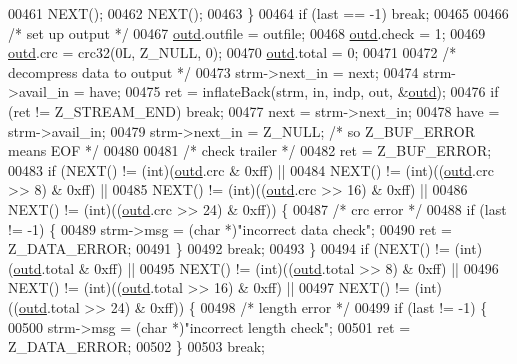 \begin{DoxyCode}
00461             NEXT();
00462             NEXT();
00463         \}
00464         \textcolor{keywordflow}{if} (last == -1) \textcolor{keywordflow}{break};
00465 
00466         \textcolor{comment}{/* set up output */}
00467         \hyperlink{structoutd}{outd}.outfile = outfile;
00468         \hyperlink{structoutd}{outd}.check = 1;
00469         \hyperlink{structoutd}{outd}.crc = crc32(0L, Z\_NULL, 0);
00470         \hyperlink{structoutd}{outd}.total = 0;
00471 
00472         \textcolor{comment}{/* decompress data to output */}
00473         strm->next\_in = next;
00474         strm->avail\_in = have;
00475         ret = inflateBack(strm, in, indp, out, &\hyperlink{structoutd}{outd});
00476         \textcolor{keywordflow}{if} (ret != Z\_STREAM\_END) \textcolor{keywordflow}{break};
00477         next = strm->next\_in;
00478         have = strm->avail\_in;
00479         strm->next\_in = Z\_NULL;             \textcolor{comment}{/* so Z\_BUF\_ERROR means EOF */}
00480 
00481         \textcolor{comment}{/* check trailer */}
00482         ret = Z\_BUF\_ERROR;
00483         \textcolor{keywordflow}{if} (NEXT() != (\textcolor{keywordtype}{int})(\hyperlink{structoutd}{outd}.crc & 0xff) ||
00484             NEXT() != (\textcolor{keywordtype}{int})((\hyperlink{structoutd}{outd}.crc >> 8) & 0xff) ||
00485             NEXT() != (\textcolor{keywordtype}{int})((\hyperlink{structoutd}{outd}.crc >> 16) & 0xff) ||
00486             NEXT() != (\textcolor{keywordtype}{int})((\hyperlink{structoutd}{outd}.crc >> 24) & 0xff)) \{
00487             \textcolor{comment}{/* crc error */}
00488             \textcolor{keywordflow}{if} (last != -1) \{
00489                 strm->msg = (\textcolor{keywordtype}{char} *)\textcolor{stringliteral}{"incorrect data check"};
00490                 ret = Z\_DATA\_ERROR;
00491             \}
00492             \textcolor{keywordflow}{break};
00493         \}
00494         \textcolor{keywordflow}{if} (NEXT() != (int)(\hyperlink{structoutd}{outd}.total & 0xff) ||
00495             NEXT() != (int)((\hyperlink{structoutd}{outd}.total >> 8) & 0xff) ||
00496             NEXT() != (int)((\hyperlink{structoutd}{outd}.total >> 16) & 0xff) ||
00497             NEXT() != (int)((\hyperlink{structoutd}{outd}.total >> 24) & 0xff)) \{
00498             \textcolor{comment}{/* length error */}
00499             \textcolor{keywordflow}{if} (last != -1) \{
00500                 strm->msg = (\textcolor{keywordtype}{char} *)\textcolor{stringliteral}{"incorrect length check"};
00501                 ret = Z\_DATA\_ERROR;
00502             \}
00503             \textcolor{keywordflow}{break};

\end{DoxyCode}
